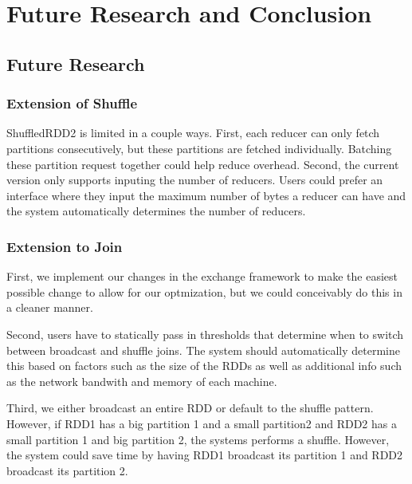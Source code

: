 \chapter{Future Research and Conclusion}

\section{Future Research}

\subsection{Extension of Shuffle}

ShuffledRDD2 is limited in a couple ways. First, each reducer can only 
fetch partitions consecutively, but these partitions are fetched individually. Batching these partition request together could
help reduce overhead. Second, the current version only supports inputing the number of reducers. Users could prefer
an interface where they input the maximum number of bytes a reducer can have and the system automatically determines the 
number of reducers.

\subsection {Extension to Join}

First, we implement our changes in the exchange framework to make the easiest possible change to allow for our optmization,
but we could conceivably do this in a cleaner manner.

Second, users have to statically pass in thresholds that determine when to switch between broadcast and
shuffle joins. The system should automatically determine this based on factors such as the size of the RDDs
as well as additional info such as the network bandwith and memory of each machine.

Third, we either broadcast an entire RDD or default to the shuffle pattern. However, if RDD1 has a big partition 1 and
a small partition2 and RDD2 has a small partition 1 and big partition 2, the systems performs a shuffle. However, the system could save time
by having RDD1 broadcast its partition 1 and RDD2 broadcast its partition 2.

